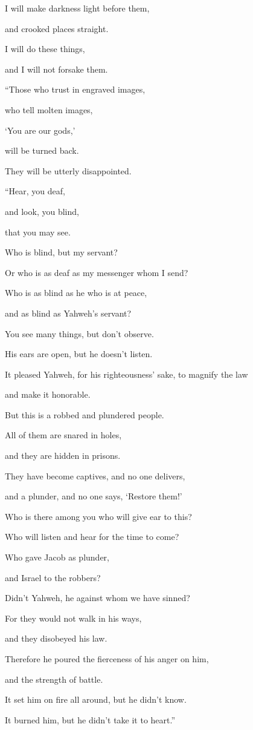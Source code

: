 {\par }{\QB I will make darkness light before them,
\par }{\QB and crooked places straight.
\par }{\QB I will do these things,
\par }{\QB and I will not forsake them.
\par }{\BB \par }{\Q {}“Those who trust in engraved images,
\par }{\QB who tell molten images,
\par }{\QB ‘You are our gods,’
\par }{\QB will be turned back.
\par }{\QB They will be utterly disappointed.
\par }{\BB \par }{\Q {}“Hear, you deaf,
\par }{\QB and look, you blind,
\par }{\QB that you may see.
\par }{\Q {}Who is blind, but my servant?
\par }{\QB Or who is as deaf as my messenger whom I send?
\par }{\Q Who is as blind as he who is at peace,
\par }{\QB and as blind as Yahweh’s servant?
\par }{\Q {}You see many things, but don’t observe.
\par }{\QB His ears are open, but he doesn’t listen.
\par }{\Q {}It pleased Yahweh, for his righteousness’ sake, to magnify the law
\par }{\QB and make it honorable.
\par }{\Q {}But this is a robbed and plundered people.
\par }{\QB All of them are snared in holes,
\par }{\QB and they are hidden in prisons.
\par }{\Q They have become captives, and no one delivers,
\par }{\QB and a plunder, and no one says, ‘Restore them!’
\par }{\BB \par }{\Q {}Who is there among you who will give ear to this?
\par }{\QB Who will listen and hear for the time to come?
\par }{\Q {}Who gave Jacob as plunder,
\par }{\QB and Israel to the robbers?
\par }{\QB Didn’t Yahweh, he against whom we have sinned?
\par }{\QB For they would not walk in his ways,
\par }{\QB and they disobeyed his law.
\par }{\Q {}Therefore he poured the fierceness of his anger on him,
\par }{\QB and the strength of battle.
\par }{\Q It set him on fire all around, but he didn’t know.
\par }{\QB It burned him, but he didn’t take it to heart.”

}
